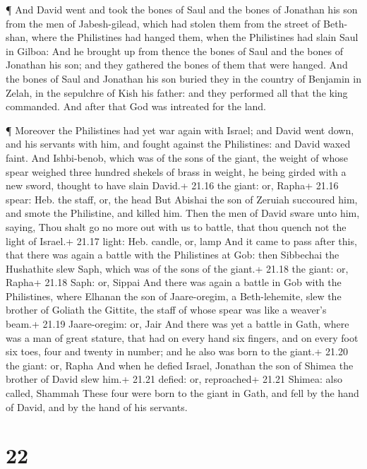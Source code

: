  ¶ And David went and took the bones of Saul and the bones
of Jonathan his son from the men of Jabesh-gilead, which had stolen them
from the street of Beth-shan, where the Philistines had hanged them,
when the Philistines had slain Saul in Gilboa:  And he
brought up from thence the bones of Saul and the bones of Jonathan his
son; and they gathered the bones of them that were hanged. 
And the bones of Saul and Jonathan his son buried they in the country of
Benjamin in Zelah, in the sepulchre of Kish his father: and they
performed all that the king commanded. And after that God was intreated
for the land.

 ¶ Moreover the Philistines had yet war again with Israel;
and David went down, and his servants with him, and fought against the
Philistines: and David waxed faint.  And Ishbi-benob, which
was of the sons of the giant, the weight of whose spear weighed three
hundred shekels of brass in weight, he being girded with a new sword,
thought to have slain David.+ 21.16 the giant: or, Rapha+ 21.16 spear:
Heb. the staff, or, the head  But Abishai the son of
Zeruiah succoured him, and smote the Philistine, and killed him. Then
the men of David sware unto him, saying, Thou shalt go no more out with
us to battle, that thou quench not the light of Israel.+ 21.17 light:
Heb. candle, or, lamp  And it came to pass after this, that
there was again a battle with the Philistines at Gob: then Sibbechai the
Hushathite slew Saph, which was of the sons of the giant.+ 21.18 the
giant: or, Rapha+ 21.18 Saph: or, Sippai  And there was
again a battle in Gob with the Philistines, where Elhanan the son of
Jaare-oregim, a Beth-lehemite, slew the brother of Goliath the Gittite,
the staff of whose spear was like a weaver's beam.+ 21.19 Jaare-oregim:
or, Jair  And there was yet a battle in Gath, where was a
man of great stature, that had on every hand six fingers, and on every
foot six toes, four and twenty in number; and he also was born to the
giant.+ 21.20 the giant: or, Rapha  And when he defied
Israel, Jonathan the son of Shimea the brother of David slew him.+ 21.21
defied: or, reproached+ 21.21 Shimea: also called, Shammah 
These four were born to the giant in Gath, and fell by the hand of
David, and by the hand of his servants.

\hypertarget{section-21}{%
\section{22}\label{section-21}}

